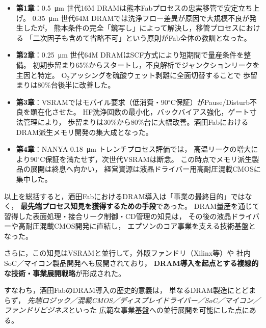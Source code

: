 \documentclass[conference]{IEEEtran}
\let\meter\metre
\begin{document}
\begin{itemize}
  \item \textbf{第1章}：\SI{0.5}{\micro\meter} 世代16M DRAMは熊本Fabプロセスの忠実移管で安定立ち上げ。
        \SI{0.35}{\micro\meter} 世代64M DRAMでは洗浄フロー差異が原因で大規模不良が発生したが，
        熊本条件の完全「鏡写し」によって解決し，移管プロセスにおける
        「二次因子も含めて省略不可」という原則がFab全体の教訓となった。
  \item \textbf{第2章}：\SI{0.25}{\micro\meter} 世代64M DRAMはSCF方式により短期間で量産条件を整備。
        初期歩留まり65\%からスタートし，不良解析でジャンクションリークを主因と特定。
        O$_2$アッシングを硫酸ウェット剥離に全面切替することで
        歩留まりは80\%台後半に改善した。
  \item \textbf{第3章}：VSRAMではモバイル要求（低消費・90$^\circ$C保証）がPause/Disturb不良を顕在化させた。
        HF洗浄回数の最小化，バックバイアス強化，ゲート寸法管理により，
        歩留まりは30\%から80\%台に大幅改善。酒田FabにおけるDRAM派生メモリ開発の集大成となった。
  \item \textbf{第4章}：NANYA \SI{0.18}{\micro\meter} トレンチプロセス評価では，
        高温リークの増大により90$^\circ$C保証を満たせず，次世代VSRAMは断念。
        この時点でメモリ派生製品の展開は終息へ向かい，
        経営資源は液晶ドライバー用高耐圧混載CMOSに集中した。
\end{itemize}

\noindent
以上を総括すると，酒田FabにおけるDRAM導入は「事業の最終目的」ではなく，
\textbf{最先端プロセス知見を獲得するための手段}であった。  
DRAM量産を通じて習得した表面処理・接合リーク制御・CD管理の知見は，
その後の液晶ドライバーや高耐圧混載CMOS開発に直結し，
エプソンのコア事業を支える技術基盤となった。

さらに，この知見はVSRAMと並行して，外販ファンドリ（Xilinx等）や
社内SoC／マイコン製品開発へも展開されており，
\textbf{DRAM導入を起点とする複線的な技術・事業展開戦略}が形成された。  

すなわち，酒田FabのDRAM導入の歴史的意義は，
単なるDRAM製造にとどまらず，
\emph{先端ロジック／混載CMOS／ディスプレイドライバー／SoC／マイコン／ファンドリビジネス}といった
広範な事業基盤への並行展開を可能にした点にある。
\end{document}
